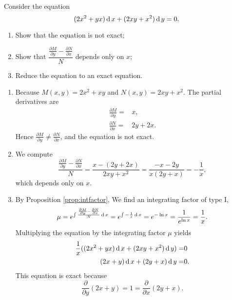 \begin{example} 
	Consider the equation
	\[ (2x^2+yx )  \operatorname{d} x +  (2xy+ x^2 )\operatorname{d} y  =0. \]
	\begin{enumerate}
		\item  Show that the equation is not exact;
		\item Show that $\dfrac{\frac{\partial M}{\partial y} - \frac{\partial N}{\partial x}}{N}$ depends only on $x$;
		\item Reduce the equation to an exact equation.
	\end{enumerate}
\end{example}
\begin{solution}
    \begin{enumerate}
      \item Because $M(x, y)= 2x^2 + xy$ and $N(x, y) = 2xy+x^2$. The partial derivatives are
      \[
      \begin{split}
      \frac{\partial M}{\partial y} = & x, \\
      \frac{\partial N}{\partial x} = &  2y+2x. 
      \end{split}
      \]
      Hence $\frac{\partial M}{\partial y} \neq \frac{\partial N}{\partial x}$, and
      the equation is not exact.
      \item 
      We compute
      \[
      \frac{\frac{\partial M}{\partial y} - \frac{\partial N}{\partial x}}{N} = \frac{x -(2y+2x)}{2xy+x^2} = \frac{-x-2y}{x(2y+x)} = -\frac{1}{x},
      \]
      which depends only on $x$.
      \item By Proposition \ref{prop:intfactor}, 
      We find an integrating factor of type I, 
      \[
      \mu = e^{\int \frac{\frac{\partial M}{\partial y} - \frac{\partial N}{\partial x}}{N} \operatorname{d} x}= e^{\int - \frac{1}{x}\operatorname{d} x} =e^{-\ln x } = \frac{1}{e^{\ln x}}=\frac{1}{x}.
      \]
        Multiplying the equation by the integrating factor $\mu$ yields
      \[ 
      \begin{aligned}
        \frac{1}{x} ((2x^2+yx )  \operatorname{d} x+ (2xy+ x^2 ) \operatorname{d} y ) =& 0 \\
        (2x+y)  \operatorname{d} x +  (2y+ x ) \operatorname{d} y =& 0. 
      \end{aligned}
      \]
      This equation is exact because
      \[\frac{\partial}{\partial y}(2x+y)=1=\frac{\partial}{\partial x}(2y+x).\]
    \end{enumerate}
\end{solution}

